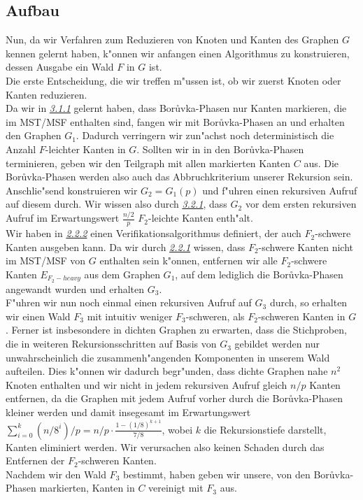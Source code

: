 \subsection{Aufbau}
Nun, da wir Verfahren zum Reduzieren von Knoten und Kanten des Graphen $G$ kennen
    gelernt haben, k"onnen wir anfangen einen Algorithmus zu konstruieren,
    dessen Ausgabe ein Wald $F$ in $G$ ist.\\
Die erste Entscheidung, die wir treffen m"ussen ist, ob wir zuerst Knoten oder Kanten
    reduzieren. \\
Da wir in \hyperref[sec:borIdea]{\textit{3.1.1}} gelernt haben, dass
    Bor\r uvka-Phasen nur Kanten markieren, die im MST/MSF 
    enthalten sind, fangen wir mit Bor\r uvka-Phasen an und erhalten den Graphen 
    $G_1$.
    Dadurch verringern wir
    zun"achst noch deterministisch die Anzahl $F$-leichter Kanten in $G$.
    Sollten wir in in den Bor\r uvka-Phasen terminieren, geben wir den Teilgraph
    mit allen markierten Kanten $C$ aus.
    Die Bor\r uvka-Phasen werden also auch das Abbruchkriterium unserer
    Rekursion sein.\\
Anschlie"send konstruieren wir $G_2 = G_1(p)$ und f"uhren einen rekursiven
    Aufruf auf diesem durch. 
    Wir wissen also durch \hyperref[sec:goodnessRand]{\textit{3.2.1}}, 
    dass $G_2$ vor dem ersten rekursiven Aufruf im Erwartungswert
    $\frac{n/2}{p}$ $F_2$-leichte Kanten enth"alt.\\
Wir haben in \hyperref[sec:verification]{\textit{2.2.2}} einen 
    Verifikationsalgorithmus definiert, der auch $F_2$-schwere Kanten ausgeben
    kann.
    Da wir durch \hyperref[sec:fProof]{\textit{2.2.1}} wissen, dass $F_2$-schwere Kanten nicht im MST/MSF von $G$
    enthalten sein k"onnen, entfernen wir alle $F_2$-schwere Kanten $E_{F_2-heavy}$
    aus dem Graphen $G_1$,
    auf dem lediglich die Bor\r uvka-Phasen angewandt wurden und erhalten $G_3$.\\
F"uhren wir nun noch einmal einen rekursiven Aufruf auf $G_3$ durch, 
    so erhalten wir 
    einen Wald $F_3$ mit intuitiv weniger $F_3$-schweren, als $F_2$-schweren Kanten in $G$.
    Ferner ist insbesondere in dichten Graphen zu erwarten, dass die Stichproben, 
    die in weiteren Rekursionsschritten auf Basis von $G_3$ gebildet werden 
    nur unwahrscheinlich die zusammenh"angenden Komponenten in unserem Wald
    aufteilen. 
    Dies k"onnen wir dadurch begr"unden, dass dichte Graphen nahe $n^2$ Knoten
    enthalten und wir nicht in jedem rekursiven Aufruf gleich $n/p$ Kanten 
    entfernen, da die Graphen mit jedem Aufruf vorher durch die Bor\r uvka-Phasen
    kleiner werden und damit insegesamt im Erwartungswert 
    $\sum_{i=0}^k (n/8^i)/p = n/p \cdot \frac{1-(1/8)^{k+1}}{7/8}$, wobei $k$
    die Rekursionstiefe darstellt, Kanten eliminiert werden.
    Wir verursachen also keinen Schaden durch das Entfernen der $F_2$-schweren
    Kanten.\\
Nachdem wir den Wald $F_3$ bestimmt, haben geben wir unsere, von den Bor\r uvka-Phasen
    markierten, Kanten in $C$ vereinigt mit $F_3$ aus.\\

